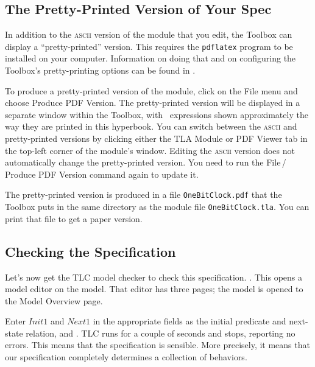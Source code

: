   \vspace{-\baselineskip}%
\subsection{The Pretty-Printed Version of Your Spec}

In addition to the \textsc{ascii} version of the module that you edit,
the Toolbox can display a ``pretty-printed'' version.  This requires
the 
\texttt{pdflatex} program to be installed on your computer.
Information on doing that and on configuring the Toolbox's
pretty-printing options can be found in 
.

To produce a pretty-printed version of the module, click on the
\textsf{File} menu and choose \textsf{Produce PDF Version}.  The 
pretty-printed version will be displayed in a separate window within
the Toolbox, with \tlaplus\ expressions shown approximately the way
they are printed in this hyperbook.  You can switch
between the \textsc{ascii} and
pretty-printed versions by clicking either the \textsf{TLA Module} or
\textsf{PDF Viewer} tab in the top-left corner of the module's window.
Editing the \textsc{ascii} version does not automatically change the
pretty-printed version.  You need to run the
\textsf{File}\,/\,\textsf{Produce PDF Version} command again to update it.

The pretty-printed version is produced in a file
\texttt{OneBitClock.pdf} that the Toolbox puts in the same directory
as the module file \texttt{OneBitClock.tla}.  You can print that file
to get a paper version.

\subsection{Checking the Specification}

Let's now get the 
TLC model checker to check this specification.
.  This opens a 
model editor on the model.  That editor has three pages; the model is
opened to the \textsf{Model Overview} page.

Enter $Init1$ and $Next1$ in the appropriate fields as the initial
predicate and next-state relation, and \@.
TLC runs for a couple of seconds and stops, reporting no errors.  This
means that the specification is sensible.  More precisely, it means
that our specification completely determines a collection of
behaviors.

